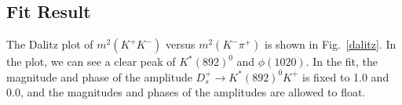 \subsection{Fit Result}
\par{
    The Dalitz plot of $m^{2}(K^{+}K^{-})$ versus $m^{2}(K^{-}\pi^{+})$ is shown in Fig.~\ref{dalitz}. 
    In the plot, we can see a clear peak of $K^{*}(892)^{0}$ and $\phi(1020)$. 
In the fit, the magnitude and phase of the amplitude $D_{s}^{+} \rightarrow K^{*}(892)^{0}K^{+}$ is fixed to 1.0 and 0.0, and the magnitudes and phases of the amplitudes are allowed to float. 


}
